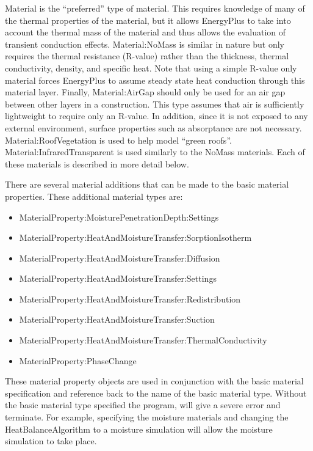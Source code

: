 Material is the ``preferred'' type of material. This requires knowledge of many of the thermal properties of the material, but it allows EnergyPlus to take into account the thermal mass of the material and thus allows the evaluation of transient conduction effects. Material:NoMass is similar in nature but only requires the thermal resistance (R-value) rather than the thickness, thermal conductivity, density, and specific heat. Note that using a simple R-value only material forces EnergyPlus to assume steady state heat conduction through this material layer. Finally, Material:AirGap should only be used for an air gap between other layers in a construction. This type assumes that air is sufficiently lightweight to require only an R-value. In addition, since it is not exposed to any external environment, surface properties such as absorptance are not necessary. Material:RoofVegetation is used to help model ``green roofs''. Material:InfraredTransparent is used similarly to the NoMass materials. Each of these materials is described in more detail below.

There are several material additions that can be made to the basic material properties. These additional material types are:

\begin{itemize}
\item
  MaterialProperty:MoisturePenetrationDepth:Settings
\item
  Material\-Prop\-erty:\-Heat\-And\-Moisture\-Trans\-fer:\-Sorp\-tion\-Iso\-therm
\item
  MaterialProperty:HeatAndMoistureTransfer:Diffusion
\item
  MaterialProperty:HeatAndMoistureTransfer:Settings
\item
  Material\-Prop\-erty:\-Heat\-And\-Moisture\-Trans\-fer:\-Re\-dist\-ribu\-tion
\item
  MaterialProperty:HeatAndMoistureTransfer:Suction
\item
  Material\-Prop\-erty:\-Heat\-And\-Moisture\-Trans\-fer:\-Thermal\-Con\-ductivity
\item
  MaterialProperty:PhaseChange
\end{itemize}

These material property objects are used in conjunction with the basic material specification and reference back to the name of the basic material type. Without the basic material type specified the program, will give a severe error and terminate. For example, specifying the moisture materials and changing the HeatBalanceAlgorithm to a moisture simulation will allow the moisture simulation to take place.

